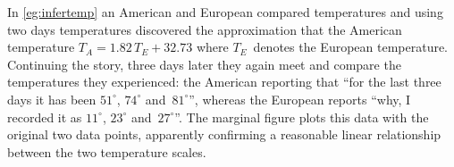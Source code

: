 \begin{example} \label{eg:infertemp2}
In \autoref{eg:infertemp} an American and European compared temperatures and using two days temperatures discovered the approximation that the American temperature \(T_A=1.82\,T_E+32.73\) where \(T_E\)~denotes the European temperature.
Continuing the story, three days later they again meet and compare the temperatures they experienced: the American reporting that ``for the last three days it has been \(51^\circ\), \(74^\circ\) and~\(81^\circ\)'', whereas the European reports ``why, I recorded it as \(11^\circ\), \(23^\circ\) and~\(27^\circ\)''.
The marginal figure plots this data with the original two data points, apparently confirming a reasonable linear relationship between the two temperature scales.


\end{example}
